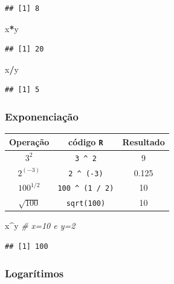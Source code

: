 \documentclass[
]{book}
\newenvironment{Shaded}{\begin{snugshade}}{\end{snugshade}}
\newcommand{\CommentTok}[1]{\textcolor[rgb]{0.56,0.35,0.01}{\textit{#1}}}
\newcommand{\NormalTok}[1]{#1}
\newcommand{\OperatorTok}[1]{\textcolor[rgb]{0.81,0.36,0.00}{\textbf{#1}}}
\theoremstyle{definition}
\theoremstyle{definition}
\theoremstyle{definition}
\theoremstyle{remark}
\begin{document}
\begin{verbatim}
## [1] 8
\end{verbatim}

\begin{Shaded}
\begin{Highlighting}[]
\NormalTok{x}\OperatorTok{*}\NormalTok{y}
\end{Highlighting}
\end{Shaded}

\begin{verbatim}
## [1] 20
\end{verbatim}

\begin{Shaded}
\begin{Highlighting}[]
\NormalTok{x}\OperatorTok{/}\NormalTok{y}
\end{Highlighting}
\end{Shaded}

\begin{verbatim}
## [1] 5
\end{verbatim}

\hypertarget{exponenciauxe7uxe3o}{%
\subsubsection{Exponenciação}\label{exponenciauxe7uxe3o}}

\begin{longtable}[]{@{}ccc@{}}
\toprule
Operação & código \texttt{R} & Resultado\tabularnewline
\midrule
\endhead
\(3^2\) & \texttt{3\ \^{}\ 2} & 9\tabularnewline
\(2^{(-3)}\) & \texttt{2\ \^{}\ (-3)} & 0.125\tabularnewline
\(100^{1/2}\) & \texttt{100\ \^{}\ (1\ /\ 2)} & 10\tabularnewline
\(\sqrt{100}\) & \texttt{sqrt(100)} & 10\tabularnewline
\bottomrule
\end{longtable}

\begin{Shaded}
\begin{Highlighting}[]
\NormalTok{x}\OperatorTok{^}\NormalTok{y         }\CommentTok{# x=10 e y=2}
\end{Highlighting}
\end{Shaded}

\begin{verbatim}
## [1] 100
\end{verbatim}

\hypertarget{logaruxedtimos}{%
\subsubsection{Logarítimos}\label{logaruxedtimos}}
\end{document}
